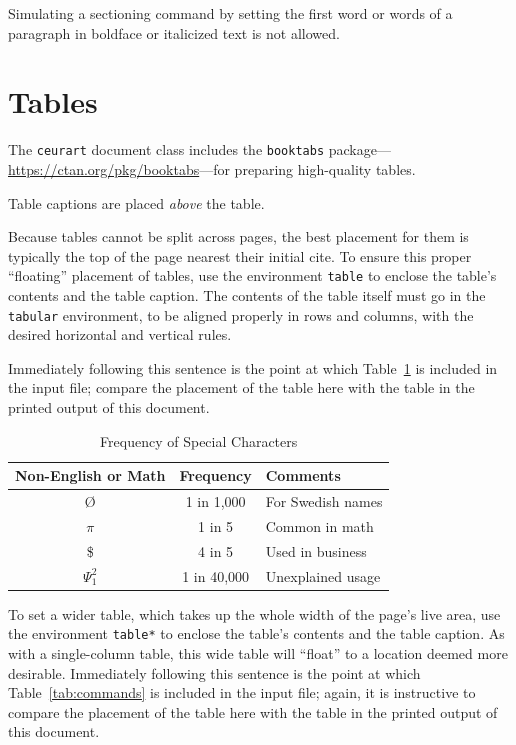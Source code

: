\documentclass[%
]{ceurart}
\begin{document}
Simulating a sectioning command by setting the first word or words of a paragraph in boldface or italicized text is not allowed.

\section{Tables}

The
\texttt{ceurart}
document class includes the
\texttt{booktabs}
package---\url{https://ctan.org/pkg/booktabs}---for preparing high-quality tables.

Table captions are placed \textit{above} the table.

Because tables cannot be split across pages, the best placement for them is typically the top of the page nearest their initial cite. To ensure this proper ``floating'' placement of tables, use the environment
\texttt{table}
to enclose the table's contents and the table caption. The contents of the table itself must go in the
\texttt{tabular}
environment, to be aligned properly in rows and columns, with the desired horizontal and vertical rules.

Immediately following this sentence is the point at which Table~\ref{tab:freq} is included in the input file; compare the placement of the table here with the table in the printed output of this document.

\begin{table}
  \caption{Frequency of Special Characters}
  \label{tab:freq}
  \begin{tabular}{ccl}
    \toprule
    Non-English or Math&Frequency&Comments\\
    \midrule
    \O & 1 in 1,000& For Swedish names\\
    $\pi$ & 1 in 5& Common in math\\
    \$ & 4 in 5 & Used in business\\
    $\Psi^2_1$ & 1 in 40,000& Unexplained usage\\
    \bottomrule
  \end{tabular}
\end{table}

To set a wider table, which takes up the whole width of the page's live area, use the environment
\texttt{table*}
to enclose the table's contents and the table caption.  As with a single-column table, this wide table will
\enquote{float}
to a location deemed more desirable.
Immediately following this sentence is the point at which Table~\ref{tab:commands} is included in the input file; again, it is instructive to compare the placement of the table here with the table in the printed output of this document.
\end{document}
